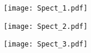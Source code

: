 \documentclass[11pt,a4paper]{report}
\begin{document}
\begin{figure}
\centering
\texttt{[image: Spect\_1.pdf]}
\end{figure}

\begin{figure}
\centering
\texttt{[image: Spect\_2.pdf]}
\end{figure}

\begin{figure}
\centering
\texttt{[image: Spect\_3.pdf]}
\end{figure}
\end{document}
